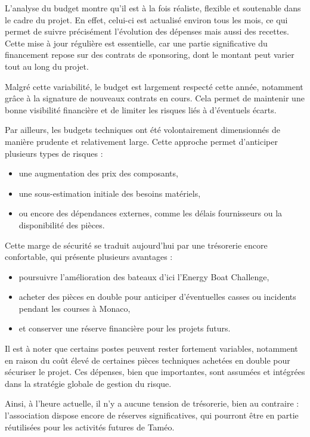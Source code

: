 \documentclass[11pt,letterpaper]{article}
\begin{document}
L'analyse du budget montre qu'il est à la fois réaliste, flexible et soutenable dans le cadre du projet. En effet, celui-ci est actualisé environ tous les mois, ce qui permet de suivre précisément l'évolution des dépenses mais aussi des recettes. Cette mise à jour régulière est essentielle, car une partie significative du financement repose sur des contrats de sponsoring, dont le montant peut varier tout au long du projet.

Malgré cette variabilité, le budget est largement respecté cette année, notamment grâce à la signature de nouveaux contrats en cours. Cela permet de maintenir une bonne visibilité financière et de limiter les risques liés à d'éventuels écarts.

Par ailleurs, les budgets techniques ont été volontairement dimensionnés de manière prudente et relativement large. Cette approche permet d'anticiper plusieurs types de risques :

\begin{itemize}
    \item une augmentation des prix des composants,
    \item une sous-estimation initiale des besoins matériels,
    \item ou encore des dépendances externes, comme les délais fournisseurs ou la disponibilité des pièces.
\end{itemize}

Cette marge de sécurité se traduit aujourd'hui par une trésorerie encore confortable, qui présente plusieurs avantages :

\begin{itemize}
    \item poursuivre l'amélioration des bateaux d'ici l'Energy Boat Challenge,
    \item acheter des pièces en double pour anticiper d'éventuelles casses ou incidents pendant les courses à Monaco,
    \item et conserver une réserve financière pour les projets futurs.
\end{itemize}

Il est à noter que certains postes peuvent rester fortement variables, notamment en raison du coût élevé de certaines pièces techniques achetées en double pour sécuriser le projet. Ces dépenses, bien que importantes, sont assumées et intégrées dans la stratégie globale de gestion du risque.

Ainsi, à l'heure actuelle, il n'y a aucune tension de trésorerie, bien au contraire : l'association dispose encore de réserves significatives, qui pourront être en partie réutilisées pour les activités futures de Taméo.
\end{document}
